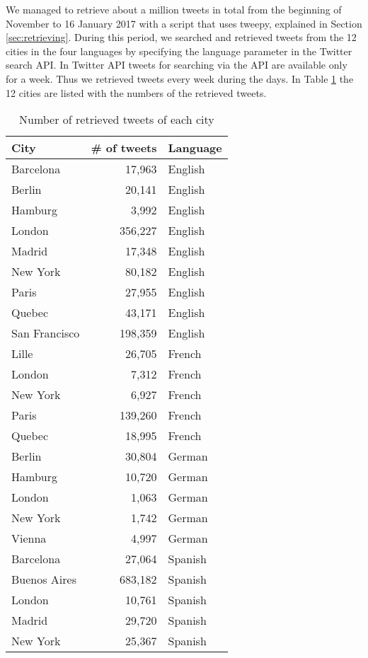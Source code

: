 We managed to retrieve about a million tweets in total from the beginning of November to 16 January 2017 with a script that uses tweepy, explained in Section \ref{sec:retrieving}.
During this period, we searched and retrieved tweets from the 12 cities in the four languages by specifying the language parameter in the Twitter search API.
In Twitter API tweets for searching via the API are available only for a week.
Thus we retrieved tweets every week during the days.
In Table \ref{tab:cities} the 12 cities are listed with the numbers of the retrieved tweets.

\begin{table}[ht]
	\caption{Number of retrieved tweets of each city}
	\centering
	\begin{tabular}{|l|r|l|} \hline
	City&\# of tweets&Language\\ \hline \hline
	Barcelona & 17,963 & English \\ \hline
	Berlin & 20,141 & English\\ \hline
	Hamburg & 3,992 & English\\ \hline
	London  & 356,227& English\\ \hline
	Madrid & 17,348 & English \\ \hline
	New York  & 80,182  & English\\ \hline
	Paris & 27,955 & English \\ \hline
	Quebec & 43,171 & English \\ \hline
	San Francisco & 198,359  & English\\ \hline
	Lille & 26,705  & French\\ \hline
	London & 7,312 & French \\ \hline
	New York & 6,927 & French \\ \hline
	Paris & 139,260 & French\\ \hline
	Quebec & 18,995 & French\\ \hline
	Berlin & 30,804 & German\\ \hline
	Hamburg & 10,720 & German\\ \hline
	London & 1,063 & German \\ \hline
	New York & 1,742& German\\ \hline
	Vienna & 4,997  & German\\ \hline
	Barcelona&27,064 & Spanish\\ \hline
	Buenos Aires&683,182  & Spanish\\ \hline
	London & 10,761 & Spanish\\ \hline
	Madrid& 29,720 & Spanish\\ \hline
	New York & 25,367 & Spanish\\ \hline
	\end{tabular}
	\label{tab:cities}
\end{table}

